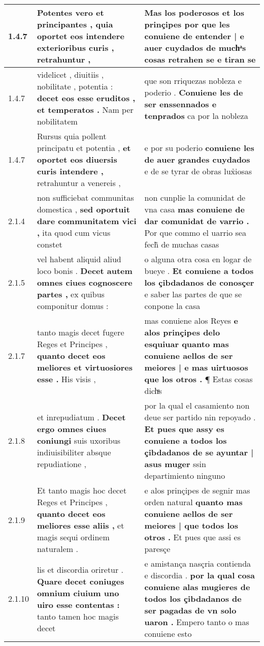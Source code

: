 \begin{tabular}{|p{1cm}|p{6.5cm}|p{6.5cm}|}
1.4.7 & Potentes vero et principantes , \textbf{ quia oportet eos intendere exterioribus curis , } retrahuntur , & Mas los poderosos et los prinçipes \textbf{ por que les conuiene de entender | e auer cuydados de muchͣs cosas retrahen se } e tiran se \\\hline
1.4.7 & videlicet , diuitiis , nobilitate , potentia : \textbf{ decet eos esse eruditos , et temperatos . } Nam per nobilitatem & que son rriquezas nobleza e poderio . \textbf{ Conuiene les de ser enssennados e tenprados } ca por la nobleza \\\hline
1.4.7 & Rursus quia pollent principatu et potentia , \textbf{ et oportet eos diuersis curis intendere , } retrahuntur a venereis , & e por su poderio \textbf{ conuiene les de auer grandes cuydados } e de se tyrar de obras lux̉iosas \\\hline
2.1.4 & non sufficiebat communitas domestica , \textbf{ sed oportuit dare communitatem vici , } ita quod cum vicus constet & non cunplie la comunidat de vna casa \textbf{ mas conuiene de dar comunidat de varrio . } Por que commo el uarrio sea fech̃ de muchas casas \\\hline
2.1.5 & vel habent aliquid aliud loco bonis . \textbf{ Decet autem omnes ciues cognoscere partes , } ex quibus componitur domus : & o alguna otra cosa en logar de bueye . \textbf{ Et conuiene a todos los çibdadanos de conosçer } e saber las partes de que se conpone la casa \\\hline
2.1.7 & tanto magis decet fugere Reges et Principes , \textbf{ quanto decet eos meliores et virtuosiores esse . } His visis , & mas conuiene alos Reyes \textbf{ e alos prinçipes delo esquiuar quanto mas conuiene aellos de ser meiores | e mas uirtuosos que los otros . } ¶ Estas cosas dichͣs \\\hline
2.1.8 & et inrepudiatum . \textbf{ Decet ergo omnes ciues coniungi } suis uxoribus indiuisibiliter absque repudiatione , & por la qual el casamiento non deue ser partido nin repoyado . \textbf{ Et pues que assy es conuiene a todos los çibdadanos de se ayuntar | asus muger } ssin departimiento ninguno \\\hline
2.1.9 & Et tanto magis hoc decet Reges et Principes , \textbf{ quanto decet eos meliores esse aliis , } et magis sequi ordinem naturalem . & e alos prinçipes de segnir mas orden natural \textbf{ quanto mas conuiene aellos de ser meiores | que todos los otros . } Et pues que assi es paresçe \\\hline
2.1.10 & lis et discordia oriretur . \textbf{ Quare decet coniuges omnium ciuium uno uiro esse contentas : } tanto tamen hoc magis decet & e amistança nasçria contienda e discordia . \textbf{ por la qual cosa conuiene alas mugieres de todos los çibdadanos de ser pagadas de vn solo uaron . } Empero tanto o mas conuiene esto \\\hline

\end{tabular}
